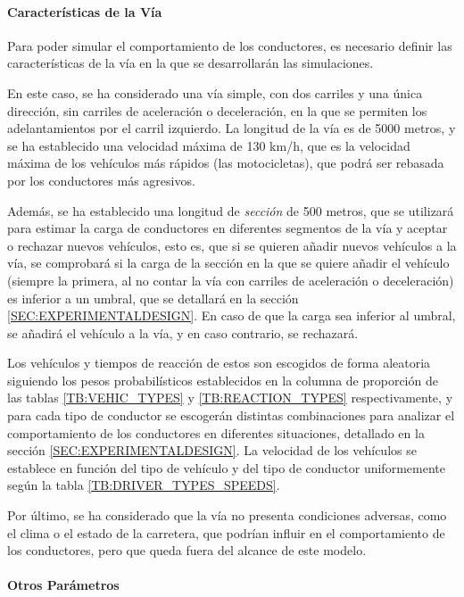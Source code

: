 \paragraph{Características de la Vía}

Para poder simular el comportamiento de los conductores, es necesario definir las características de la vía en la que se desarrollarán las simulaciones.

En este caso, se ha considerado una vía simple, con dos carriles y una única dirección, sin carriles de aceleración o deceleración, en la que se permiten los adelantamientos por el carril izquierdo. La longitud
de la vía es de 5000 metros, y se ha establecido una velocidad máxima de 130 km/h, que es la velocidad máxima de los vehículos más rápidos (las motocicletas), que podrá
ser rebasada por los conductores más agresivos.

Además, se ha establecido una longitud de \textit{sección} de 500 metros, que se utilizará para estimar la carga de conductores en diferentes
segmentos de la vía y aceptar o rechazar nuevos vehículos, esto es, que si se quieren añadir nuevos vehículos a la vía, se comprobará si la carga de la sección en
la que se quiere añadir el vehículo (siempre la primera, al no contar la vía con carriles de aceleración o deceleración) es inferior a un umbral, que se detallará en
la sección \ref{SEC:EXPERIMENTALDESIGN}. En caso de que la carga sea inferior al umbral, se añadirá el vehículo a la vía, y en caso contrario, se rechazará.

Los vehículos y tiempos de reacción de estos son escogidos de forma aleatoria siguiendo los pesos probabilísticos establecidos en la columna de proporción de
las tablas \ref{TB:VEHIC_TYPES} y \ref{TB:REACTION_TYPES} respectivamente, y para cada tipo de conductor se escogerán distintas combinaciones para analizar
el comportamiento de los conductores en diferentes situaciones, detallado en la sección \ref{SEC:EXPERIMENTALDESIGN}.
La velocidad de los vehículos se establece en función del tipo de vehículo y del tipo de conductor uniformemente según la tabla \ref{TB:DRIVER_TYPES_SPEEDS}.

Por último, se ha considerado que la vía no presenta condiciones adversas, como el clima o el estado de la carretera, que podrían influir en el comportamiento de los
conductores, pero que queda fuera del alcance de este modelo.

\paragraph{Otros Parámetros}

